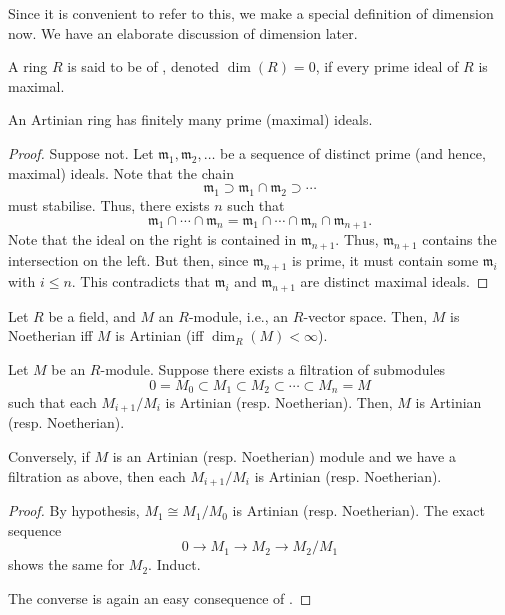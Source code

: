 \documentclass[12pt]{article}
\begin{document}
Since it is convenient to refer to this, we make a special definition of dimension now. We have an elaborate discussion of dimension later.

\begin{defn}
	A ring $R$ is said to be of , denoted $\dim(R) = 0$, if every prime ideal of $R$ is maximal.
\end{defn}

\begin{prop}
	An Artinian ring has finitely many prime (maximal) ideals.
\end{prop}
\begin{proof} 
	Suppose not. Let $\mathfrak{m}_{1}, \mathfrak{m}_{2}, \ldots$ be a sequence of distinct prime (and hence, maximal) ideals. Note that the chain
	\begin{equation*} 
		\mathfrak{m}_{1} \supset \mathfrak{m}_{1} \cap \mathfrak{m}_{2} \supset \cdots
	\end{equation*}
	must stabilise. Thus, there exists $n$ such that
	\begin{equation*} 
		\mathfrak{m}_{1} \cap \cdots \cap \mathfrak{m}_{n} = \mathfrak{m}_{1} \cap \cdots \cap \mathfrak{m}_{n} \cap \mathfrak{m}_{n + 1}.
	\end{equation*}
	Note that the ideal on the right is contained in $\mathfrak{m}_{n + 1}$. Thus, $\mathfrak{m}_{n + 1}$ contains the intersection on the left. But then, since $\mathfrak{m}_{n + 1}$ is prime, it must contain some $\mathfrak{m}_{i}$ with $i \le n$. This contradicts that $\mathfrak{m}_{i}$ and $\mathfrak{m}_{n + 1}$ are distinct maximal ideals.
\end{proof}

\begin{prop}
	Let $R$ be a field, and $M$ an $R$-module, i.e., an $R$-vector space. Then, $M$ is Noetherian iff $M$ is Artinian (iff $\dim_{R}(M) < \infty$).
\end{prop}

\begin{prop}
	Let $M$ be an $R$-module. Suppose there exists a filtration of submodules
	\begin{equation*} 
		0 = M_{0} \subset M_{1} \subset M_{2} \subset \cdots \subset M_{n} = M
	\end{equation*}
	such that each $M_{i + 1}/M_{i}$ is Artinian (resp. Noetherian). Then, $M$ is Artinian (resp. Noetherian).

	Conversely, if $M$ is an Artinian (resp. Noetherian) module and we have a filtration as above, then each $M_{i + 1}/M_{i}$ is Artinian (resp. Noetherian).
\end{prop}
\begin{proof} 
	By hypothesis, $M_{1} \cong M_{1}/M_{0}$ is Artinian (resp. Noetherian). The exact sequence
	\begin{equation*} 
		0 \to M_{1} \to M_{2} \to M_{2}/M_{1}
	\end{equation*}
	shows the same for $M_{2}$. Induct.

	The converse is again an easy consequence of .
\end{proof}
\end{document}
